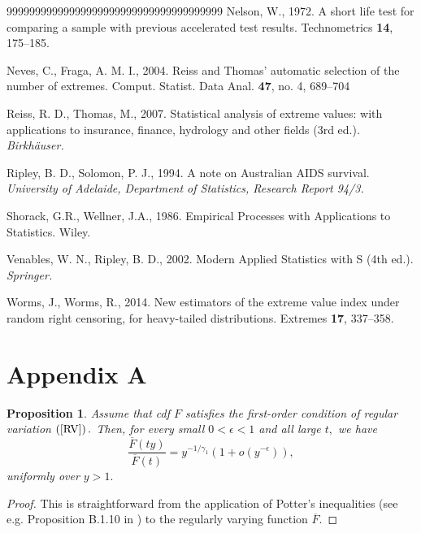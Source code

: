 \documentclass[reqno,openbib,runningheads,a4paper,12pt]{amsart}%
\newtheorem{proposition}{Proposition}[section]
\begin{document}
\begin{thebibliography}{99999999999999999999999999999999999999}
Nelson, W., 1972. A short life test for
comparing a sample with previous accelerated test results. Technometrics
\textbf{14}, 175--185.

Neves, C., Fraga, A. M. I., 2004. Reiss
and Thomas' automatic selection of the number of extremes. Comput. Statist.
Data Anal. \textbf{47}, no. 4, 689--704

Reiss, R. D., Thomas, M., 2007.
Statistical analysis of extreme values: with applications to insurance,
finance, hydrology and other fields (3rd ed.). \textit{Birkh\"{a}user.}

Ripley, B. D., Solomon, P. J., 1994.
A note on Australian AIDS survival. \textit{University of Adelaide, Department
of Statistics, Research Report 94/3.}

Shorack, G.R., Wellner, J.A., 1986.
Empirical Processes with Applications to Statistics. Wiley.

Venables, W. N., Ripley, B. D.,
2002. Modern Applied Statistics with S (4th ed.). \textit{Springer.}

Worms, J., Worms, R., 2014. New
estimators of the extreme value index under random right censoring, for
heavy-tailed distributions. Extremes \textbf{17}, 337--358.
\end{thebibliography}

\section{\textbf{Appendix A \label{Appendix A}}}

\begin{proposition}
\textbf{\label{prop1}}Assume that cdf $F$ satisfies the first-order condition
of regular variation $\left(  \ref{RV}\right)  .$ Then, for every small
$0<\epsilon<1$ and all large $t,$ we have
\[
\frac{\overline{F}\left(  ty\right)  }{\overline{F}\left(  t\right)
}=y^{-1/\gamma_{1}}\left(  1+o\left(  y^{-\epsilon}\right)  \right)  ,
\]
uniformly over $y>1.$
\end{proposition}

\begin{proof}
This is straightforward from the application of Potter's inequalities (see
e.g. Proposition B.1.10 in \cite{deHF06}) to the regularly varying function
$\overline{F}.$
\end{proof}
\end{document}
